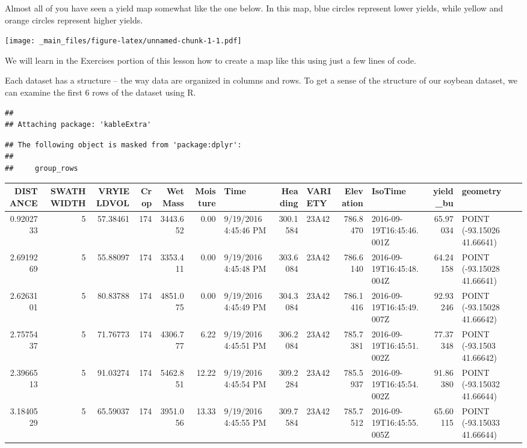 \documentclass[
]{book}
\begin{document}
Almost all of you have seen a yield map somewhat like the one below. In
this map, blue circles represent lower yields, while yellow and orange
circles represent higher yields.

\texttt{[image: \_main\_files/figure-latex/unnamed-chunk-1-1.pdf]}

We will learn in the Exercises portion of this lesson how to create a
map like this using just a few lines of code.

Each dataset has a structure -- the way data are organized in columns
and rows. To get a sense of the structure of our soybean dataset, we can
examine the first 6 rows of the dataset using R.

\begin{verbatim}
## 
## Attaching package: 'kableExtra'
\end{verbatim}

\begin{verbatim}
## The following object is masked from 'package:dplyr':
## 
##     group_rows
\end{verbatim}

\begin{tabular}[t]{r|r|r|r|r|r|l|r|l|r|l|r|l}
\hline
DISTANCE & SWATHWIDTH & VRYIELDVOL & Crop & WetMass & Moisture & Time & Heading & VARIETY & Elevation & IsoTime & yield\_bu & geometry\\
\hline
0.9202733 & 5 & 57.38461 & 174 & 3443.652 & 0.00 & 9/19/2016 4:45:46 PM & 300.1584 & 23A42 & 786.8470 & 2016-09-19T16:45:46.001Z & 65.97034 & POINT (-93.15026 41.66641)\\
\hline
2.6919269 & 5 & 55.88097 & 174 & 3353.411 & 0.00 & 9/19/2016 4:45:48 PM & 303.6084 & 23A42 & 786.6140 & 2016-09-19T16:45:48.004Z & 64.24158 & POINT (-93.15028 41.66641)\\
\hline
2.6263101 & 5 & 80.83788 & 174 & 4851.075 & 0.00 & 9/19/2016 4:45:49 PM & 304.3084 & 23A42 & 786.1416 & 2016-09-19T16:45:49.007Z & 92.93246 & POINT (-93.15028 41.66642)\\
\hline
2.7575437 & 5 & 71.76773 & 174 & 4306.777 & 6.22 & 9/19/2016 4:45:51 PM & 306.2084 & 23A42 & 785.7381 & 2016-09-19T16:45:51.002Z & 77.37348 & POINT (-93.1503 41.66642)\\
\hline
2.3966513 & 5 & 91.03274 & 174 & 5462.851 & 12.22 & 9/19/2016 4:45:54 PM & 309.2284 & 23A42 & 785.5937 & 2016-09-19T16:45:54.002Z & 91.86380 & POINT (-93.15032 41.66644)\\
\hline
3.1840529 & 5 & 65.59037 & 174 & 3951.056 & 13.33 & 9/19/2016 4:45:55 PM & 309.7584 & 23A42 & 785.7512 & 2016-09-19T16:45:55.005Z & 65.60115 & POINT (-93.15033 41.66644)\\
\hline
\end{tabular}
\end{document}
